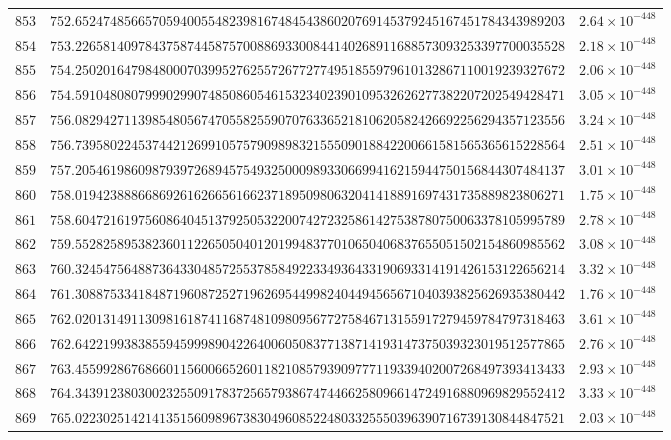 \documentclass[12pt,reqno]{amsart}
\theoremstyle{remark}
\begin{document}
\begin{longtable}{clc}
$853$ & $752.6524748566570594005548239816748454386020769145379245167451784343989203$ & $2.64\times 10^{-448}$ \\
$854$ & $753.2265814097843758744587570088693300844140268911688573093253397700035528$ & $2.18\times 10^{-448}$ \\
$855$ & $754.2502016479848000703995276255726772774951855979610132867110019239327672$ & $2.06\times 10^{-448}$ \\
$856$ & $754.5910480807999029907485086054615323402390109532626277382207202549428471$ & $3.05\times 10^{-448}$ \\
$857$ & $756.0829427113985480567470558255907076336521810620582426692256294357123556$ & $3.24\times 10^{-448}$ \\
$858$ & $756.7395802245374421269910575790989832155509018842200661581565365615228564$ & $2.51\times 10^{-448}$ \\
$859$ & $757.2054619860987939726894575493250009893306699416215944750156844307484137$ & $3.01\times 10^{-448}$ \\
$860$ & $758.0194238886686926162665616623718950980632041418891697431735889823806271$ & $1.75\times 10^{-448}$ \\
$861$ & $758.6047216197560864045137925053220074272325861427538780750063378105995789$ & $2.78\times 10^{-448}$ \\
$862$ & $759.5528258953823601122650504012019948377010650406837655051502154860985562$ & $3.08\times 10^{-448}$ \\
$863$ & $760.3245475648873643304857255378584922334936433190693314191426153122656214$ & $3.32\times 10^{-448}$ \\
$864$ & $761.3088753341848719608725271962695449982404494565671040393825626935380442$ & $1.76\times 10^{-448}$ \\
$865$ & $762.0201314911309816187411687481098095677275846713155917279459784797318463$ & $3.61\times 10^{-448}$ \\
$866$ & $762.6422199383855945999890422640060508377138714193147375039323019512577865$ & $2.76\times 10^{-448}$ \\
$867$ & $763.4559928676866011560066526011821085793909777119339402007268497393413433$ & $2.93\times 10^{-448}$ \\
$868$ & $764.3439123803002325509178372565793867474466258096614724916880969829552412$ & $3.33\times 10^{-448}$ \\
$869$ & $765.0223025142141351560989673830496085224803325550396390716739130844847521$ & $2.03\times 10^{-448}$ \\

\end{longtable}
\end{document}

